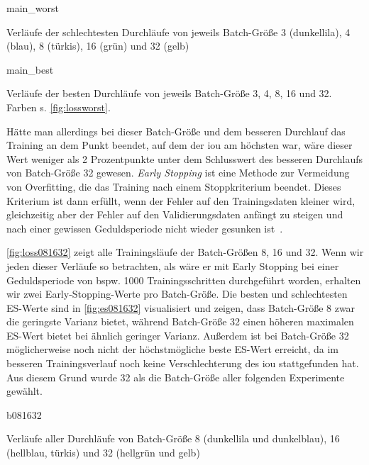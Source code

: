 \begin{losses}{main_worst}
	\caption[Verläufe der schlechtesten Durchläufe von jeweils Batch-Größe 3, 4, 8, 16 und 32]{Verläufe der schlechtesten Durchläufe von jeweils Batch-Größe 3 (dunkellila), 4 (blau), 8 (türkis), 16 (grün) und 32 (gelb)}
	\label{fig:lossworst}
\end{losses}

\begin{losses}{main_best}
	\caption[Verläufe der besten Durchläufe von jeweils Batch-Größe 3, 4, 8, 16 und 32]{Verläufe der besten Durchläufe von jeweils Batch-Größe 3, 4, 8, 16 und 32. Farben s. \autoref{fig:lossworst}.}
	\label{fig:lossbest}
\end{losses}

Hätte man allerdings bei dieser Batch-Größe und dem besseren Durchlauf das Training an dem Punkt beendet, auf dem der \gls{iou} am höchsten war, wäre dieser Wert weniger als 2 Prozentpunkte unter dem Schlusswert des besseren Durchlaufs von Batch-Größe 32 gewesen.
\emph{Early Stopping} ist eine Methode zur Vermeidung von Overfitting, die das Training nach einem Stoppkriterium beendet.
Dieses Kriterium ist dann erfüllt, wenn der Fehler auf den Trainingsdaten kleiner wird, gleichzeitig aber der Fehler auf den Validierungsdaten anfängt zu steigen und nach einer gewissen Geduldsperiode nicht wieder gesunken ist~\cite{Goodfellow.2016}.

\autoref{fig:loss081632} zeigt alle Trainingsläufe der Batch-Größen 8, 16 und 32.
Wenn wir jeden dieser Verläufe so betrachten, als wäre er mit Early Stopping bei einer Geduldsperiode von bspw. 1000 Trainingsschritten durchgeführt worden, erhalten wir zwei Early-Stopping-Werte pro Batch-Größe.
Die besten und schlechtesten ES-Werte sind in \autoref{fig:es081632} visualisiert und zeigen, dass Batch-Größe 8 zwar die geringste Varianz bietet, während Batch-Größe 32 einen höheren maximalen ES-Wert bietet bei ähnlich geringer Varianz.
Außerdem ist bei Batch-Größe 32 möglicherweise noch nicht der höchstmögliche beste ES-Wert erreicht, da im besseren Trainingsverlauf noch keine Verschlechterung des \gls{iou} stattgefunden hat.
Aus diesem Grund wurde 32 als die Batch-Größe aller folgenden Experimente gewählt.

\begin{losses}{b081632}
	\caption[Verläufe aller Durchläufe von Batch-Größe 8, 16 und 32]{Verläufe aller Durchläufe von Batch-Größe 8 (dunkellila und dunkelblau), 16 (hellblau, türkis) und 32 (hellgrün und gelb)}
	\label{fig:loss081632}
\end{losses}

